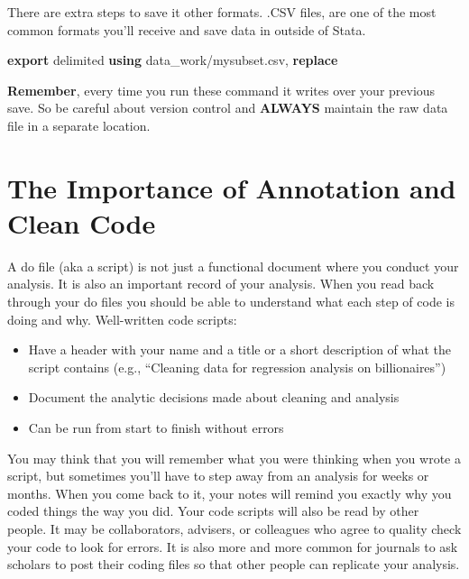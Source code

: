 \documentclass[
]{book}
\newenvironment{Shaded}{\begin{snugshade}}{\end{snugshade}}
\newcommand{\KeywordTok}[1]{\textcolor[rgb]{0.13,0.29,0.53}{\textbf{#1}}}
\newcommand{\NormalTok}[1]{#1}
\providecommand{\tightlist}{%
  \setlength{\itemsep}{0pt}\setlength{\parskip}{0pt}}
\begin{document}
There are extra steps to save it other formats. .CSV files, are one of the most common formats you'll receive and save data in outside of Stata.

\begin{Shaded}
\begin{Highlighting}[]
\KeywordTok{export}\NormalTok{ delimited }\KeywordTok{using}\NormalTok{ data\_work/mysubset.csv, }\KeywordTok{replace} 
\end{Highlighting}
\end{Shaded}

\textbf{Remember}, every time you run these command it writes over your previous save. So be careful about version control and \textbf{ALWAYS} maintain the raw data file in a separate location.

\hypertarget{the-importance-of-annotation-and-clean-code}{%
\section{The Importance of Annotation and Clean Code}\label{the-importance-of-annotation-and-clean-code}}

A do file (aka a script) is not just a functional document where you conduct your analysis. It is also an important record of your analysis. When you read back through your do files you should be able to understand what each step of code is doing and why. Well-written code scripts:

\begin{itemize}
\tightlist
\item
  Have a header with your name and a title or a short description of what the script contains (e.g., ``Cleaning data for regression analysis on billionaires'')
\item
  Document the analytic decisions made about cleaning and analysis
\item
  Can be run from start to finish without errors
\end{itemize}

You may think that you will remember what you were thinking when you wrote a script, but sometimes you'll have to step away from an analysis for weeks or months. When you come back to it, your notes will remind you exactly why you coded things the way you did. Your code scripts will also be read by other people. It may be collaborators, advisers, or colleagues who agree to quality check your code to look for errors. It is also more and more common for journals to ask scholars to post their coding files so that other people can replicate your analysis.
\end{document}
